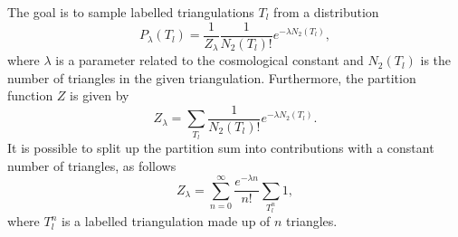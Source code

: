 The goal is to sample labelled triangulations $T_l$ from a distribution
\begin{equation}
    P_\lambda (T_l) = \frac{1}{Z_\lambda} \frac{1}{N_2(T_l)!} e^{- \lambda N_2(T_l)},
\end{equation}
where $\lambda$ is a parameter related to the cosmological constant and $N_2(T_l)$ is the number of triangles in the given triangulation. Furthermore, the partition function $Z$ is given by
\begin{equation}
    Z_\lambda = \sum_{T_l} \frac{1}{N_2(T_l)!} e^{- \lambda N_2(T_l)}.
\end{equation}
It is possible to split up the partition sum into contributions with a constant number of triangles, as follows
\begin{equation}
    Z_\lambda = \sum_{n = 0}^\infty \frac{e^{- \lambda n}}{n!} \sum_{T_l^n} 1,
\end{equation}
where $T_l^n$ is a labelled triangulation made up of $n$ triangles.